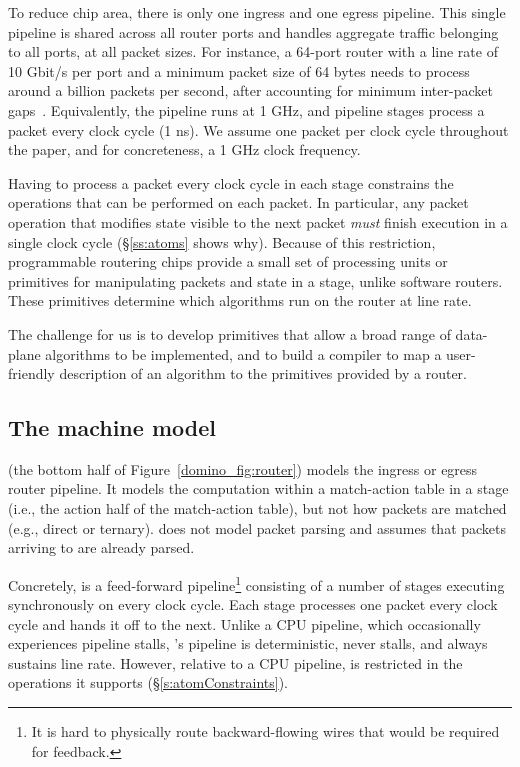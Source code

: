 To reduce chip area, there is only one ingress and one egress pipeline.  This
single pipeline is shared across all router ports and handles aggregate traffic
belonging to all ports, at all packet sizes.  For instance, a 64-port router
with a line rate of 10 Gbit/s per port and a minimum packet size of 64 bytes
needs to process around a billion packets per second, after accounting for
minimum inter-packet gaps~\cite{rmt}.  Equivalently, the pipeline runs at 1
GHz, and pipeline stages process a packet every clock cycle (1 ns).  We assume
one packet per clock cycle throughout the paper, and for concreteness, a
1 GHz clock frequency.

Having to process a packet every clock cycle in each stage constrains
the operations that can be performed on each packet. In particular, any packet
operation that modifies state visible to the next packet {\em must} finish
execution in a single clock cycle (\S\ref{ss:atoms} shows why). Because
of this restriction, programmable routering chips provide a small set of
processing units or primitives for manipulating packets and state in a stage,
unlike software routers. These primitives determine which algorithms
run on the router at line rate.

The challenge for us is to develop primitives that allow a broad range of
data-plane algorithms to be implemented, and to build a compiler to map a
user-friendly description of an algorithm to the primitives provided by a
router.

\subsection{The \absmachine machine model}

\absmachine (the bottom half of Figure~\ref{domino_fig:router}) models
the ingress or egress router pipeline.  It models the
computation within a match-action table in a stage (i.e., the action half of
the match-action table), but not how packets are matched (e.g., direct or
ternary). \absmachine does not model packet parsing and assumes
that packets arriving to \absmachine are already parsed.

 Concretely, \absmachine is a feed-forward pipeline\footnote{It is hard to
physically route backward-flowing wires that would be required for feedback.}
consisting of a number of stages executing synchronously on every clock cycle.
Each stage processes one packet every clock cycle and hands it off to the next.
Unlike a CPU pipeline, which occasionally experiences pipeline stalls,
\absmachine's pipeline is deterministic, never stalls, and always sustains line
rate. However, relative to a CPU pipeline, \absmachine is restricted in the
operations it supports (\S\ref{s:atomConstraints}).

